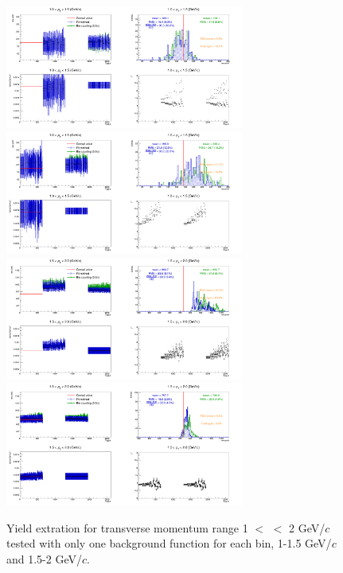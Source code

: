 \begin{figure}[!h]
\begin{center}
\includegraphics[width=0.7\textwidth]{figures/Dstar/pp13TeV/multi_trial/multi_bin_bkg4alt_1-1dot5GeV.png}
\includegraphics[width=0.7\textwidth]{figures/Dstar/pp13TeV/multi_trial/multi_bin_bkg4std_1-1dot5GeV.png}
\includegraphics[width=0.7\textwidth]{figures/Dstar/pp13TeV/multi_trial/multi_bin_bkg5alt_1dot5-2GeV.png}
\includegraphics[width=0.7\textwidth]{figures/Dstar/pp13TeV/multi_trial/multi_bin_bkg5std_1dot5-2GeV.png}
\caption{Yield extration for transverse momentum range 1 $<$ \pt $<$ 2 GeV/$c$ tested with only one background function for each \pt bin, 1-1.5 GeV/$c$ and 1.5-2 GeV/$c$.}
\label{fig:DstarYieldSyst010_33}
\end{center}
\end{figure}



